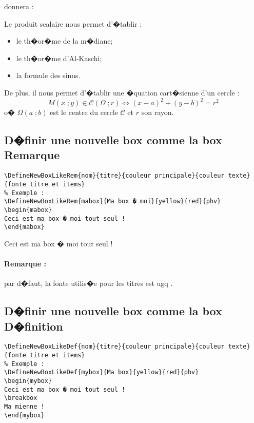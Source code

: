 \documentclass[ams,openany,10pt,presentation,latin1]{mathbook}
\begin{document}
donnera :

\begin{propriete}[s]
Le produit scalaire nous permet d'�tablir :
\begin{itemize}
\item le th�or�me de la m�diane;
\item le th�or�me d'Al-Kaschi;
\item la formule des sinus.
\end{itemize}
\breakbox
De plus, il nous permet d'�tablir une �quation cart�sienne d'un cercle :
\[
M(x\;;y)\in\mathscr{C}(\Omega\;;r) \Longleftrightarrow (x-a)^2+(y-b)^2=r^2
\]
o� $\Omega(a\;;b)$ est le centre du cercle $\mathscr{C}$ et $r$ son rayon.
\end{propriete}

\subsection{D�finir une nouvelle box comme la box \og Remarque \fg{} }

\begin{lstlisting}
\DefineNewBoxLikeRem{nom}{titre}{couleur principale}{couleur texte}{fonte titre et items}
% Exemple :
\DefineNewBoxLikeRem{mabox}{Ma box � moi}{yellow}{red}{phv}
\begin{mabox}
Ceci est ma box � moi tout seul !
\end{mabox}
\end{lstlisting}

\begin{mabox}
Ceci est ma box � moi tout seul !
\end{mabox}

\paragraph*{Remarque :} par d�faut, la fonte utilis�e pour les titres est \og ugq \fg.

\subsection{D�finir une nouvelle box comme la box \og D�finition \fg{} }

\begin{lstlisting}
\DefineNewBoxLikeDef{nom}{titre}{couleur principale}{couleur texte}{fonte titre et items}
% Exemple :
\DefineNewBoxLikeDef{mybox}{Ma box}{yellow}{red}{phv}
\begin{mybox}
Ceci est ma box � moi tout seul !
\breakbox
Ma mienne !
\end{mybox}
\end{lstlisting}
\end{document}
